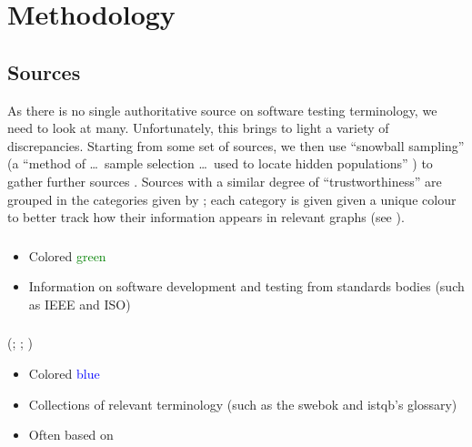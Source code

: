 \section{Methodology}
\label{methodology}

\subsection{Sources}
\label{sources}
As there is no single authoritative source on software testing terminology,
we need to look at many. Unfortunately, this brings to light a variety of
discrepancies. Starting from some set of sources, we then use
``snowball sampling'' (a ``method of \dots\ sample selection \dots\ used to
locate hidden populations'' \citep{Johnson2014}) to gather further sources%
. Sources with a similar degree of
``trustworthiness'' are grouped in the categories
given by ; each category is given given a unique
colour to better track how their information appears in relevant graphs
(see ).

\subsubsection{}
\label{stds}
\citep{IEEE2022, IEEE2017,
    IEEE2013, ISO_IEC2023b, IEEE2012, ISO_IEC2023a,
    IEEE2021, ISO_IEC2018, ISO2021, ISO2015}
\begin{itemize}
    \item Colored \textcolor{green}{green}
    \item Information on software development and testing from
          standards bodies \ifnotpaper\else (such as IEEE and ISO)\fi
\end{itemize}

\subsubsection{}
\label{metas}
\ifnotpaper
    (\citealp{SWEBOK2024, SWEBOK2014};
    \citealpISTQB{}; \citealp{Firesmith2015})
\else
    \cite{SWEBOK2024, SWEBOK2014, ISTQB, Firesmith2015}
\fi
\begin{itemize}
    \item Colored \textcolor{blue}{blue}
    \item Collections of relevant terminology (such as the \acs{swebok} and
          \acs{istqb}'s glossary)
    \item Often based on 
\end{itemize}

